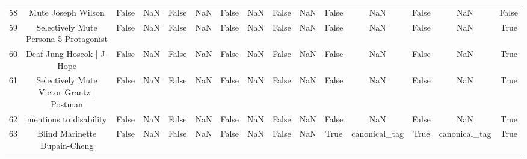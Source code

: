 \begin{table}[h!]
{\begin{tabular}{|c|c|c|c|c|c|c|c|c|c|c|c|c|c|c|}
         58 &                                Mute Joseph Wilson &                          False &                       NaN &                          False &                       NaN &                          False &                       NaN &                          False &                       NaN &                          False &                       NaN &                          False &                       NaN &                          False \\
         59 &            Selectively Mute Persona 5 Protagonist &                          False &                       NaN &                          False &                       NaN &                          False &                       NaN &                          False &                       NaN &                          False &                       NaN &                          False &                       NaN &                           True \\
         60 &                         Deaf Jung Hoseok | J-Hope &                          False &                       NaN &                          False &                       NaN &                          False &                       NaN &                          False &                       NaN &                          False &                       NaN &                          False &                       NaN &                           True \\
         61 &          Selectively Mute Victor Grantz | Postman &                          False &                       NaN &                          False &                       NaN &                          False &                       NaN &                          False &                       NaN &                          False &                       NaN &                          False &                       NaN &                           True \\
         62 &                            mentions to disability &                          False &                       NaN &                          False &                       NaN &                          False &                       NaN &                          False &                       NaN &                          False &                       NaN &                          False &                       NaN &                           True \\
         63 &                      Blind Marinette Dupain-Cheng &                          False &                       NaN &                          False &                       NaN &                          False &                       NaN &                          False &                       NaN &                           True &             canonical\_tag &                           True &             canonical\_tag &                           True \\

\end{tabular}}
\end{table}
